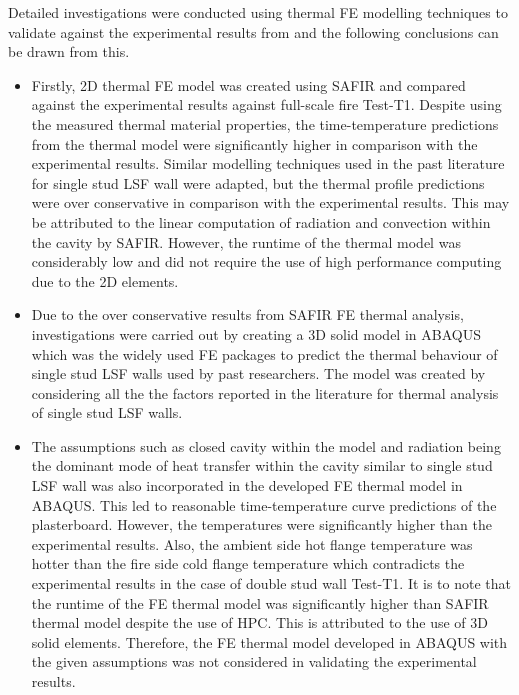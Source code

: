 Detailed investigations were conducted using thermal FE modelling techniques to validate against the experimental results from  and the following conclusions can be drawn from this. 
\begin{itemize}
	\item Firstly, 2D thermal FE model was created using SAFIR and compared against the experimental results against full-scale fire Test-T1. Despite using the measured thermal material properties, the time-temperature predictions from the thermal model were significantly higher in comparison with the experimental results. Similar modelling techniques used in the past literature for single stud LSF wall were adapted, but the thermal profile predictions were over conservative in comparison with the experimental results. This may be attributed to the linear computation of radiation and convection within the cavity by SAFIR. However, the runtime of the thermal model was considerably low and did not require the use of high performance computing due to the 2D elements.
	\item Due to the over conservative results from SAFIR FE thermal analysis, investigations were carried out by creating a 3D solid model in ABAQUS which was the widely used FE packages to predict the thermal behaviour of single stud LSF walls used by past researchers. The model was created by considering all the the factors reported in the literature for thermal analysis of single stud LSF walls. 
	\item The assumptions such as closed cavity within the model and radiation being the dominant mode of heat transfer within the cavity similar to single stud LSF wall was also incorporated in the developed FE thermal model in ABAQUS. This led to reasonable time-temperature curve predictions of the plasterboard. However, the temperatures were significantly higher than the experimental results. Also, the ambient side hot flange temperature was hotter than the fire side cold flange temperature which contradicts the experimental results in the case of double stud wall Test-T1. It is to note that the runtime of the FE thermal model was significantly higher than SAFIR thermal model despite the use of HPC. This is attributed to the use of 3D solid elements. Therefore, the FE thermal model developed in ABAQUS with the given assumptions was not considered in validating the experimental results. 

\end{itemize}
